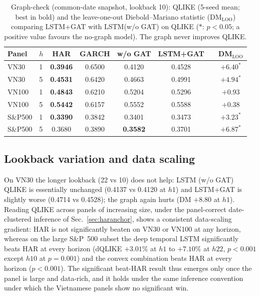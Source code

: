 \documentclass[runningheads]{llncs}
\begin{document}
\begin{table}[t]
\centering
\caption{Graph-check (common-date snapshot, lookback 10): QLIKE (5-seed mean; best in bold) and the
leave-one-out Diebold--Mariano statistic (DM$_{\mathrm{LOO}}$) comparing LSTM+GAT with LSTM(w/o GAT) on QLIKE
($*$: $p<0.05$; a positive value favours the no-graph model). The graph never improves QLIKE.}
\label{tab:graph}
\begin{tabular}{llcccc c c}
\toprule
Panel & $h$ & HAR & GARCH & w/o GAT & LSTM+GAT & & DM$_{\mathrm{LOO}}$ \\
\midrule
VN30   & 1 & \textbf{0.3946} & 0.6500 & 0.4120 & 0.4528 & & $+6.40^{*}$ \\
VN30   & 5 & \textbf{0.4531} & 0.6420 & 0.4663 & 0.4991 & & $+4.94^{*}$ \\
VN100  & 1 & \textbf{0.4843} & 0.6210 & 0.5204 & 0.5296 & & $+0.93$ \\
VN100  & 5 & \textbf{0.5442} & 0.6157 & 0.5552 & 0.5588 & & $+0.38$ \\
S\&P500& 1 & \textbf{0.3390} & 0.3842 & 0.3401 & 0.3473 & & $+3.23^{*}$ \\
S\&P500& 5 & 0.3680 & 0.3890 & \textbf{0.3582} & 0.3701 & & $+6.87^{*}$ \\
\bottomrule
\end{tabular}
\end{table}

\subsection{Lookback variation and data scaling}
On VN30 the longer lookback (22 vs 10) does not help: LSTM (w/o GAT) QLIKE is essentially unchanged
(0.4137 vs 0.4120 at $h1$) and LSTM+GAT is slightly worse (0.4714 vs 0.4528); the graph again hurts
(DM $+8.80$ at $h1$). Reading QLIKE across panels of increasing size, under the panel-correct date-clustered
inference of Sec.~\ref{sec:haranchor}, shows a consistent data-scaling gradient: HAR is not significantly
beaten on VN30 or VN100 at any horizon, whereas on the large S\&P~500 subset the deep temporal LSTM
significantly beats HAR at every horizon (dQLIKE $+3.01\%$ at $h1$ to $+7.10\%$ at $h22$, $p<0.001$ except
$h10$ at $p=0.001$) and the convex combination beats HAR at every horizon ($p<0.001$). The significant
beat-HAR result thus emerges only once the panel is large and data-rich, and it holds under the same
inference convention under which the Vietnamese panels show no significant win.
\end{document}
